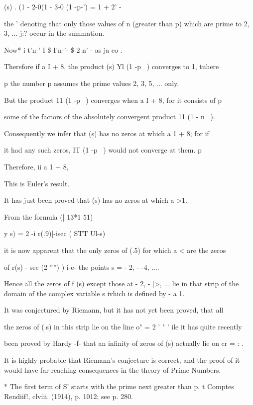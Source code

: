  (s) . (1 - 2-0(1 - 3-0  (1 -p-') = 1 + 2' -

the ' denoting that only those values of n (greater than p) which are
prime to 2, 3, ... j:? occur in the summation.

Now* i t'n-' I \$ I'n-'- \$ 2 n' - as ja co .

Therefore if a I + 8, the product (s) Yl (1 -p~ ) converges to 1,
tuhere

p the number p assumes the prime values 2, 3, 5, ... only.

But the product 11 (1 -p~ ) converges when a I + 8, for it consists of
p

some of the factors of the absolutely convergent product 11 (1 - n~ ).

Consequently we infer that (s) has no zeros at which a 1 + 8; for if

it had any such zeros, IT (1 -p~ ) would not converge at them. p

Therefore, ii a 1 + 8,

This is Euler's result.


It has just been proved that (s) has no zeros at which a >1.

From the formula (| 13*1 51)

y s) = 2 -i r(.9)|-isec ( STT Ul-s)

it is now apparent that the only zeros of (.5) for which a < are the
zeros

of r(s) - sec (2 '''') ) i-e- the points s = - 2, - -4, ....

Hence all the zeros of f (s) except those at - 2, - ]>, ... lie in
that strip of the domain of the complex variable s ivhich is defined
by - a 1.

It was conjectured by Riemann, but it has not yet been proved, that
all

the zeros of (.s) in this strip lie on the line o" = 2 ' " ' ile it
has quite recently

been proved by Hardy -f- that an infinity of zeros of (s) actually lie
on cr = : .

It is highly probable that Riemann's conjecture is correct, and the
proof of it would have far-reaching consequences in the theory of
Prime Numbers.

* The first term of S' starts with the prime next greater than p. t
Comptes Rendiif!, clviii. (1914), p. 1012; see p. 280.

